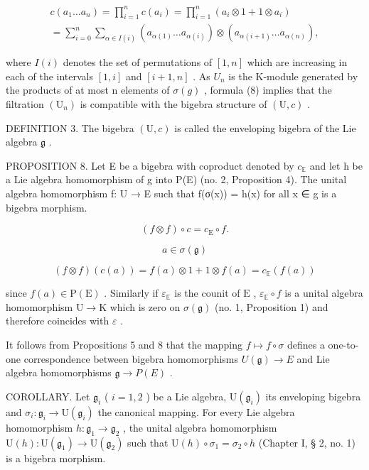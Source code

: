 \[
\begin{array}{l} c (a _ {1} \ldots a _ {n}) = \prod_ {i = 1} ^ {n} c (a _ {i}) = \prod_ {i = 1} ^ {n} (a _ {i} \otimes 1 + 1 \otimes a _ {i}) \\ = \sum_ {i = 0} ^ {n} \sum_ {\alpha \in I (i)} (a _ {\alpha (1)} \ldots a _ {\alpha (i)}) \otimes (a _ {\alpha (i + 1)} \ldots a _ {\alpha (n)}), \end{array}\tag{8}
\]

where \(I(i)\) denotes the set of permutations of \([1, n]\) which are increasing in each of the intervals \([1, i]\) and \([i + 1, n]\) . As \(U_{n}\) is the K-module generated by the products of at most n elements of \(\sigma(g)\) , formula (8) implies that the filtration \((\mathrm{U}_{n})\) is compatible with the bigebra structure of \((\mathrm{U}, c)\) .

DEFINITION 3. The bigebra \((\mathrm{U}, c)\) is called the enveloping bigebra of the Lie algebra \(\mathfrak{g}\) .

PROPOSITION 8. Let E be a bigebra with coproduct denoted by \(c_{\mathbb{E}}\) and let h be a Lie algebra homomorphism of g into P(E) (no. 2, Proposition 4). The unital algebra homomorphism f: U → E such that f(σ(x)) = h(x) for all x ∈ g is a bigebra morphism.

\[
(f \otimes f) \circ c = c _ {\mathrm{E}} \circ f.
\]

\[
a \in \sigma (\mathfrak {g})
\]

\[
(f \otimes f) (c (a)) = f (a) \otimes 1 + 1 \otimes f (a) = c _ {\mathbb {E}} (f (a))
\]

since \(f(a) \in \mathrm{P}(\mathrm{E})\) . Similarly if \(\varepsilon_{\mathbb{E}}\) is the counit of \(\mathrm{E}\) , \(\varepsilon_{\mathbb{E}} \circ f\) is a unital algebra homomorphism \(\mathrm{U} \to \mathrm{K}\) which is zero on \(\sigma(\mathfrak{g})\) (no. 1, Proposition 1) and therefore coincides with \(\varepsilon\) .

It follows from Propositions 5 and 8 that the mapping \(f \mapsto f \circ \sigma\) defines a one-to-one correspondence between bigebra homomorphisms \(U(\mathfrak{g}) \to E\) and Lie algebra homomorphisms \(\mathfrak{g} \to P(E)\) .

COROLLARY. Let \(\mathfrak{g}_i\) ( \(i = 1,2\) ) be a Lie algebra, \(\mathrm{U}(\mathfrak{g}_i)\) its enveloping bigebra and \(\sigma_i\colon \mathfrak{g}_i\to \mathrm{U}(\mathfrak{g}_i)\) the canonical mapping. For every Lie algebra homomorphism \(h\colon \mathfrak{g}_1\to \mathfrak{g}_2\) , the unital algebra homomorphism \(\mathrm{U}(h)\colon \mathrm{U}(\mathfrak{g}_1)\to \mathrm{U}(\mathfrak{g}_2)\) such that \(\mathrm{U}(h)\circ \sigma_1 = \sigma_2\circ h\) (Chapter I, § 2, no. 1) is a bigebra morphism.

